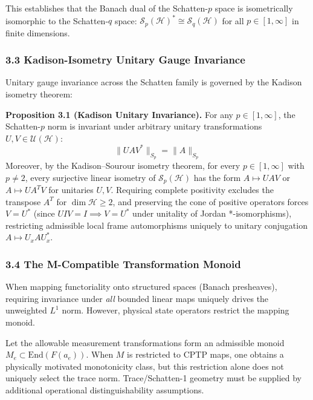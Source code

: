 \documentclass[
]{article}
\begin{document}
This establishes that the Banach dual of the Schatten-\(p\) space is isometrically isomorphic to the Schatten-\(q\) space: \(\mathcal{S}_p(\mathcal{H})^* \cong \mathcal{S}_q(\mathcal{H})\) for all \(p \in [1, \infty]\) in finite dimensions.

\subsubsection{3.3 Kadison-Isometry Unitary Gauge Invariance}\label{kadison-isometry-unitary-gauge-invariance}

Unitary gauge invariance across the Schatten family is governed by the Kadison isometry theorem:

\textbf{Proposition 3.1 (Kadison Unitary Invariance).} For any \(p \in [1, \infty]\), the Schatten-\(p\) norm is invariant under arbitrary unitary transformations \(U, V \in \mathcal{U}(\mathcal{H})\):
\[\|U A V^*\|_{S_p} = \|A\|_{S_p}\]
Moreover, by the Kadison--Sourour isometry theorem, for every \(p \in [1, \infty]\) with \(p \neq 2\), every surjective linear isometry of \(\mathcal{S}_p(\mathcal{H})\) has the form \(A \mapsto U A V\) or \(A \mapsto U A^T V\) for unitaries \(U, V\). Requiring complete positivity excludes the transpose \(A^T\) for \(\dim \mathcal{H} \ge 2\), and preserving the cone of positive operators forces \(V = U^*\) (since \(U I V = I \implies V = U^*\) under unitality of Jordan *-isomorphisms), restricting admissible local frame automorphisms uniquely to unitary conjugation \(A \mapsto U_x A U_x^*\).

\subsubsection{3.4 The M-Compatible Transformation Monoid}\label{the-m-compatible-transformation-monoid}

When mapping functoriality onto structured spaces (Banach presheaves), requiring invariance under \emph{all} bounded linear maps uniquely drives the unweighted \(L^1\) norm. However, physical state operators restrict the mapping monoid.

Let the allowable measurement transformations form an admissible monoid \(M_e \subset \text{End}(F(a_e))\).
When \(M\) is restricted to CPTP maps, one obtains a physically motivated monotonicity class, but this restriction alone does not uniquely select the trace norm. Trace/Schatten-1 geometry must be supplied by additional operational distinguishability assumptions.
\end{document}
